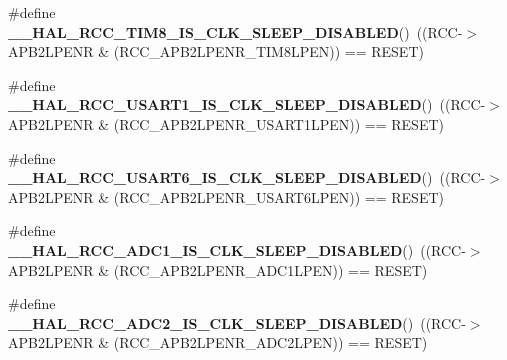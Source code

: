 \begin{DoxyCompactItemize}
\item 
\mbox{\label{group___r_c_c___clock___sleep___enable___disable___status_ga605970ce7bf7802eba14e5edf27973f6}} 
\#define {\bfseries \+\_\+\+\_\+\+H\+A\+L\+\_\+\+R\+C\+C\+\_\+\+T\+I\+M8\+\_\+\+I\+S\+\_\+\+C\+L\+K\+\_\+\+S\+L\+E\+E\+P\+\_\+\+D\+I\+S\+A\+B\+L\+ED}()~((R\+CC-\/$>$A\+P\+B2\+L\+P\+E\+NR \& (R\+C\+C\+\_\+\+A\+P\+B2\+L\+P\+E\+N\+R\+\_\+\+T\+I\+M8\+L\+P\+EN)) == R\+E\+S\+ET)
\item 
\mbox{\label{group___r_c_c___clock___sleep___enable___disable___status_ga2123ed8a27c8cf060899c1e7a923b8c8}} 
\#define {\bfseries \+\_\+\+\_\+\+H\+A\+L\+\_\+\+R\+C\+C\+\_\+\+U\+S\+A\+R\+T1\+\_\+\+I\+S\+\_\+\+C\+L\+K\+\_\+\+S\+L\+E\+E\+P\+\_\+\+D\+I\+S\+A\+B\+L\+ED}()~((R\+CC-\/$>$A\+P\+B2\+L\+P\+E\+NR \& (R\+C\+C\+\_\+\+A\+P\+B2\+L\+P\+E\+N\+R\+\_\+\+U\+S\+A\+R\+T1\+L\+P\+EN)) == R\+E\+S\+ET)
\item 
\mbox{\label{group___r_c_c___clock___sleep___enable___disable___status_ga3fe070ff84207cc0827889954947815d}} 
\#define {\bfseries \+\_\+\+\_\+\+H\+A\+L\+\_\+\+R\+C\+C\+\_\+\+U\+S\+A\+R\+T6\+\_\+\+I\+S\+\_\+\+C\+L\+K\+\_\+\+S\+L\+E\+E\+P\+\_\+\+D\+I\+S\+A\+B\+L\+ED}()~((R\+CC-\/$>$A\+P\+B2\+L\+P\+E\+NR \& (R\+C\+C\+\_\+\+A\+P\+B2\+L\+P\+E\+N\+R\+\_\+\+U\+S\+A\+R\+T6\+L\+P\+EN)) == R\+E\+S\+ET)
\item 
\mbox{\label{group___r_c_c___clock___sleep___enable___disable___status_ga5b3baade56bc0603ac5b3ae3bf3b7da9}} 
\#define {\bfseries \+\_\+\+\_\+\+H\+A\+L\+\_\+\+R\+C\+C\+\_\+\+A\+D\+C1\+\_\+\+I\+S\+\_\+\+C\+L\+K\+\_\+\+S\+L\+E\+E\+P\+\_\+\+D\+I\+S\+A\+B\+L\+ED}()~((R\+CC-\/$>$A\+P\+B2\+L\+P\+E\+NR \& (R\+C\+C\+\_\+\+A\+P\+B2\+L\+P\+E\+N\+R\+\_\+\+A\+D\+C1\+L\+P\+EN)) == R\+E\+S\+ET)
\item 
\mbox{\label{group___r_c_c___clock___sleep___enable___disable___status_gac440620a8ec2cbeb45fc57ff74901d4f}} 
\#define {\bfseries \+\_\+\+\_\+\+H\+A\+L\+\_\+\+R\+C\+C\+\_\+\+A\+D\+C2\+\_\+\+I\+S\+\_\+\+C\+L\+K\+\_\+\+S\+L\+E\+E\+P\+\_\+\+D\+I\+S\+A\+B\+L\+ED}()~((R\+CC-\/$>$A\+P\+B2\+L\+P\+E\+NR \& (R\+C\+C\+\_\+\+A\+P\+B2\+L\+P\+E\+N\+R\+\_\+\+A\+D\+C2\+L\+P\+EN)) == R\+E\+S\+ET)

\end{DoxyCompactItemize}
